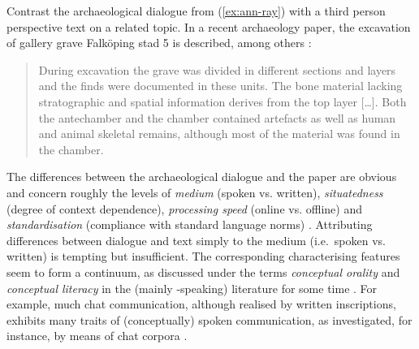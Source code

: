 \documentclass[output=paper
	        ,collection
	        ,collectionchapter
 	        ,biblatex
                ,babelshorthands
                ,newtxmath
                ,draftmode
                ,colorlinks, citecolor=brown
]{langscibook}
\begin{document}
Contrast the archaeological dialogue from (\ref{ex:ann-ray}) with a third person perspective text on a related topic.
%
In a recent archaeology paper, the excavation of gallery grave Falk\"{o}ping stad 5 is described, among others \citep[]{Blank:Tornberg:Knipper:2018}:
%
\begin{quote}
During excavation the grave was divided in different sections and layers and the finds were documented in these units. The bone material lacking stratographic and spatial information derives from the top layer [\ldots]. Both the antechamber and the chamber contained artefacts as well as human and animal skeletal remains, although most of the material was found in the chamber.
\end{quote}


The differences between the archaeological dialogue and the paper are obvious and concern roughly the levels of \emph{medium}  (spoken vs. written), \emph{situatedness}  (degree of context dependence), \emph{processing speed}  (online vs. offline) and \emph{standardisation}  (compliance with standard language norms) \citep{Klein:1985}.
%
Attributing differences between dialogue and text simply to the medium (i.e.\ spoken vs. written) is tempting but insufficient. 
%
The corresponding characterising features seem to form a continuum, as discussed under the terms \emph{conceptual orality}  and \emph{conceptual literacy}  in the (mainly -speaking) literature for some time \citep{Koch:Oesterreicher:1985}.
%
For example, much chat communication, although realised by written inscriptions, exhibits many traits of (conceptually) spoken communication, as investigated, for instance, by means of chat corpora \citep{Beisswenger:et:al:2012:a}. 
%
\end{document}
